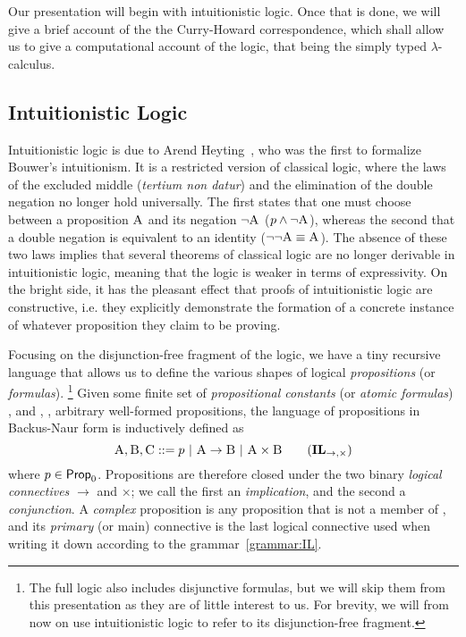 Our presentation will begin with intuitionistic logic. 
Once that is done, we will give a brief account of the the Curry-Howard correspondence, which shall allow us to give a computational account of the logic, that being the simply typed $\lambda$-calculus.

\subsection{Intuitionistic Logic}
\label{subsection:intuitionistic_logic}
Intuitionistic logic is due to Arend Heyting~\cite{heyting1930}, who was the first to formalize Bouwer's intuitionism.
It is a restricted version of classical logic, where the laws of the excluded middle (\textit{tertium non datur}) and the elimination of the double negation no longer hold universally.
The first states that one must choose between a proposition $\prop{A}$ and its negation $\neg \prop{A}$ ($p \wedge \neg \prop{A}$), whereas the second that a double negation is equivalent to an identity ($\neg \neg \prop{A} \equiv \prop{A}$).
The absence of these two laws implies that several theorems of classical logic are no longer derivable in intuitionistic logic, meaning that the logic is weaker in terms of expressivity.
On the bright side, it has the pleasant effect that proofs of intuitionistic logic are constructive, i.e. they explicitly demonstrate the formation of a concrete instance of whatever proposition they claim to be proving.

Focusing on the disjunction-free fragment of the logic, we have a tiny recursive language that allows us to define the various shapes of logical \textit{propositions} (or \textit{formulas}).%
\footnote{The full logic also includes disjunctive formulas, but we will skip them from this presentation as they are of little interest to us. For brevity, we will from now on use intuitionistic logic to refer to its disjunction-free fragment.}
Given some finite set of \textit{propositional constants} (or \textit{atomic formulas}) \propcon{}, and , ,  arbitrary well-formed propositions, the language of propositions in Backus-Naur form is inductively defined as 
\begin{equation}
\prop{A}, \prop{B}, \prop{C} ::= p \ | \ \prop{A} \to \prop{B} \ | \ \prop{A} \times \prop{B} 
\tag{$\IL_{\to, \times}$}
\label{grammar:IL}
\end{equation}
where $p \in \mathsf{Prop}_0{}$.
Propositions are therefore closed under the two binary \textit{logical connectives} $\to$ and $\times$; we call the first an \textit{implication}, and the second a \textit{conjunction}. 
A \textit{complex} proposition is any proposition that is not a member of \propcon{}, and its \textit{primary} (or main) connective is the last logical connective used when writing it down according to the grammar~\ref{grammar:IL}.

